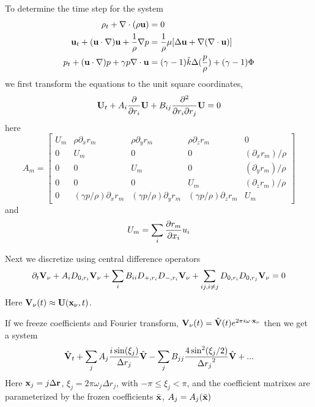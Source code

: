 \documentclass{article}
\begin{document}
To determine the time step for the system
\begin{align*}
   \rho_t + \nabla\cdot(\rho {\bf u}) &= 0 \\
   {\bf u}_t + ({\bf u}\cdot\nabla){\bf u} + {1\over\rho}\nabla p &= {1\over\rho} \mu [\Delta {\bf u} + \nabla(\nabla\cdot{\bf u}) ] \\
   p_t + ({\bf u}\cdot\nabla) p + \gamma p \nabla\cdot{\bf u} &= 
           (\gamma-1)\tilde{k} \Delta({p\over \rho}) +(\gamma-1) \Phi
\end{align*}
we first transform the equations to the unit square coordinates,
\[
  {\bf U}_t + A_i {\partial \over \partial r_i} {\bf U} 
     + B_{ij} {\partial^2 \over \partial r_i \partial r_j} {\bf U} = 0
\]
here
\[
A_m =
\begin{bmatrix} 
            U_m & \rho \partial_x r_m & \rho \partial_y r_m & \rho \partial_z r_m & 0 \\
            0   & U_m                 & 0                   & 0                   & (\partial_x r_m)/\rho \\ 
            0   & 0                   & U_m                 & 0                   & (\partial_y r_m)/\rho \\
            0   & 0                   & 0                   & U_m                 & (\partial_z r_m)/\rho \\
            0   & (\gamma p/\rho)\partial_x r_m & (\gamma p/\rho)\partial_y r_m &(\gamma p/\rho)\partial_z r_m  & U_m
\end{bmatrix}
\]
and
\[
    U_m =  \sum_i {\partial r_m \over \partial x_i} u_i 
\]

Next we discretize using central difference operators
\[
  \partial_ t {\bf V}_\nu + A_i D_{0,r_i} {\bf V}_\nu
     + \sum_i B_{ii} D_{+,r_i} D_{-,r_i}{\bf V}_\nu + \sum_{ij,i\ne j} D_{0,r_i} D_{0,r_j} {\bf V}_\nu = 0
\]
Here ${\bf V}_\nu(t)\approx {\bf U}({\bf x}_\nu,t)$.


\newcommand{\omegav}{{\bf\omega}}
If we freeze coefficients and Fourier transform, $\Vv_\nu(t) = \hat{\Vv}(t)e^{2\pi i \omegav\cdot\xv_\nu}$ 
 then we get a system
\[
   \hat{{\bf V}}_t + \sum_j A_j {i\sin(\xi_j) \over \Delta r_j} \hat{{\bf V}}
     - \sum_j B_{jj} {4 \sin^2( \xi_j/2) \over {\Delta r_j}^2 } \hat{{\bf V}} + ...
\]
Here ${\bf x}_j = j \Delta {\bf r}$, $\xi_j = 2\pi\omega_j \Delta r_j$, with $-\pi \le \xi_j < \pi$, and the
coefficient matrixes are parameterized by the frozen coefficients $\bar{{\bf x}}$, $A_j=A_j(\bar{{\bf x}})$
\end{document}

